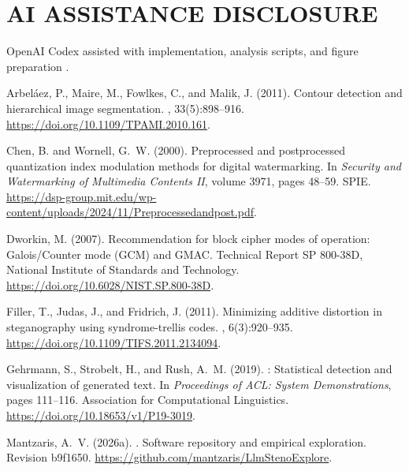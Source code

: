 \documentclass[a4paper,twoside]{article}
\begin{document}
\section*{\uppercase{AI Assistance Disclosure}}
\label{sec:ai}
OpenAI Codex assisted with implementation, analysis scripts, and figure preparation \cite{codex}. 
{\small

\begin{thebibliography}{}

Arbel{\'a}ez, P., Maire, M., Fowlkes, C., and Malik, J. (2011).
\newblock Contour detection and hierarchical image segmentation.
,
  33(5):898--916.
\newblock \url{https://doi.org/10.1109/TPAMI.2010.161}.

Chen, B. and Wornell, G.~W. (2000).
\newblock Preprocessed and postprocessed quantization index modulation methods
  for digital watermarking.
\newblock In {\em Security and Watermarking of Multimedia Contents II}, volume
  3971, pages 48--59. SPIE.
\newblock
  \url{https://dsp-group.mit.edu/wp-content/uploads/2024/11/Preprocessedandpost.pdf}.

Dworkin, M. (2007).
\newblock Recommendation for block cipher modes of operation: {Galois/Counter}
  mode ({GCM}) and {GMAC}.
\newblock Technical Report SP 800-38D, National Institute of Standards and
  Technology.
\newblock \url{https://doi.org/10.6028/NIST.SP.800-38D}.

Filler, T., Judas, J., and Fridrich, J. (2011).
\newblock Minimizing additive distortion in steganography using
  syndrome-trellis codes.
,
  6(3):920--935.
\newblock \url{https://doi.org/10.1109/TIFS.2011.2134094}.

Gehrmann, S., Strobelt, H., and Rush, A.~M. (2019).
: Statistical detection and visualization of generated text.
\newblock In {\em Proceedings of ACL: System Demonstrations}, pages 111--116.
  Association for Computational Linguistics.
\newblock \url{https://doi.org/10.18653/v1/P19-3019}.

Mantzaris, A.~V. (2026a).
.
\newblock Software repository and empirical exploration.
\newblock Revision b9f1650. \url{https://github.com/mantzaris/LlmStenoExplore}.


\end{thebibliography}}
\end{document}
